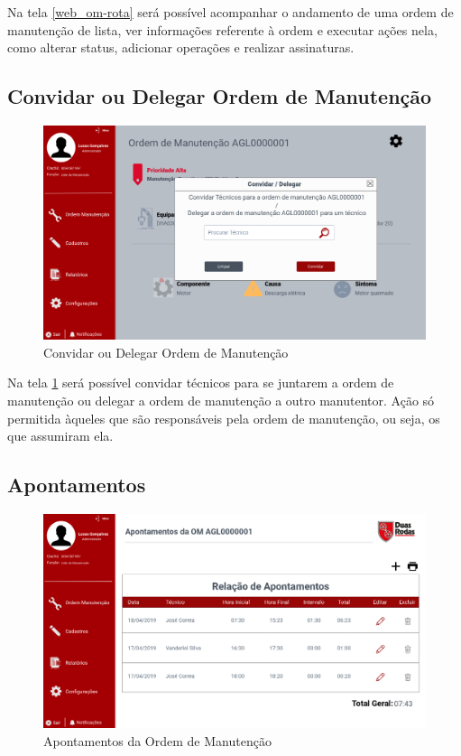 Na tela \ref{web_om-rota} será possível acompanhar o andamento de uma ordem de manutenção de lista, ver informações referente à ordem e executar ações nela, como alterar status, adicionar operações e realizar assinaturas.

\newpage
\subsection{Convidar ou Delegar Ordem de Manutenção}

\begin{figure}[htb]
	\caption{\label{web_om-convidar-delegar}Convidar ou Delegar Ordem de Manutenção}
	\begin{center}
		\includegraphics[scale=0.40]{./Figuras/web/om-convidar-delegar.png}
	\end{center}
\end{figure}

Na tela \ref{web_om-convidar-delegar} será possível convidar técnicos para se juntarem a ordem de manutenção ou delegar a ordem de manutenção a outro manutentor. Ação só permitida àqueles que são responsáveis pela ordem de manutenção, ou seja, os que assumiram ela.

\newpage
\subsection{Apontamentos}

\begin{figure}[htb]
	\caption{\label{web_om-apontamentos}Apontamentos da Ordem de Manutenção}
	\begin{center}
		\includegraphics[scale=0.40]{./Figuras/web/om-apontamentos.png}
	\end{center}
\end{figure}

